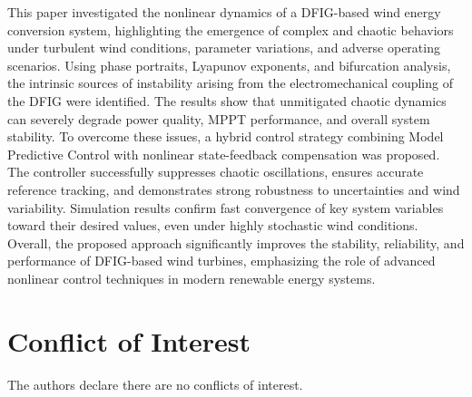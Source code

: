 \documentclass[conference]{IEEEtran}
\begin{document}
This paper investigated the nonlinear dynamics of a DFIG-based wind energy conversion system, highlighting the emergence of complex and chaotic behaviors under turbulent wind conditions, parameter variations, and adverse operating scenarios. Using phase portraits, Lyapunov exponents, and bifurcation analysis, the intrinsic sources of instability arising from the electromechanical coupling of the DFIG were identified. The results show that unmitigated chaotic dynamics can severely degrade power quality, MPPT performance, and overall system stability. To overcome these issues, a hybrid control strategy combining Model Predictive Control with nonlinear state-feedback compensation was proposed. The controller successfully suppresses chaotic oscillations, ensures accurate reference tracking, and demonstrates strong robustness to uncertainties and wind variability. Simulation results confirm fast convergence of key system variables toward their desired values, even under highly stochastic wind conditions. Overall, the proposed approach significantly improves the stability, reliability, and performance of DFIG-based wind turbines, emphasizing the role of advanced nonlinear control techniques in modern renewable energy systems.

\section*{Conflict of Interest}
The authors declare there are no conflicts of interest.
\end{document}
